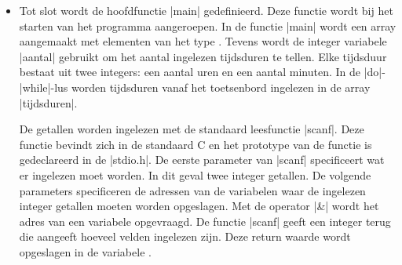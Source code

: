 \begin{clstShortInline}
\begin{itemize}
    \item 
    Tot slot wordt de hoofdfunctie |main| gedefinieerd.
	Deze functie wordt bij het starten van het programma aangeroepen.
	In de functie |main| wordt een array  aangemaakt met  elementen van het type .
	Tevens wordt de integer variabele |aantal| gebruikt om het aantal ingelezen tijdsduren te tellen.
	Elke tijdsduur bestaat uit twee integers: een aantal uren en een aantal minuten.
	In de |do|\hyp{}|while|\hyp{}lus worden tijdsduren vanaf het toetsenbord ingelezen in de array |tijdsduren|.
	
	De getallen worden ingelezen met de standaard leesfunctie |scanf|.
	Deze functie bevindt zich in de standaard C  en het prototype van de functie is gedeclareerd in de  |stdio.h|.
	De eerste parameter van |scanf| specificeert wat er ingelezen moet worden.
	In dit geval twee integer getallen.
	De volgende parameters specificeren de adressen van de variabelen waar de ingelezen integer getallen moeten worden opgeslagen.
	Met de operator |&| wordt het adres van een variabele opgevraagd.
	De functie |scanf| geeft een integer terug die aangeeft hoeveel velden ingelezen zijn.
	Deze return waarde wordt opgeslagen in de variabele .
	

\end{itemize}
\end{clstShortInline}

